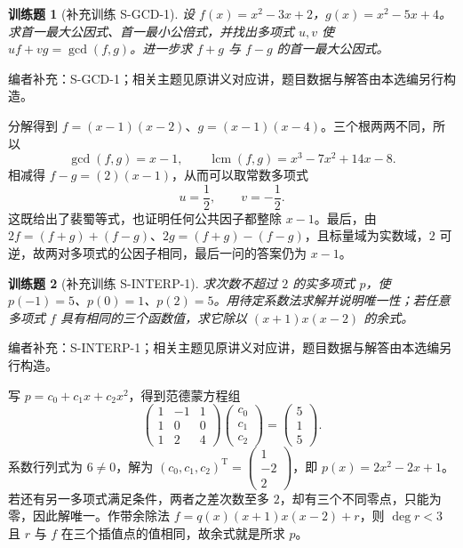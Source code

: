 \documentclass[UTF8,12pt,a4paper,fontset=fandol]{ctexart}
\newtheorem{exercise}{训练题}[section]
\begin{document}
\begin{exercise}[补充训练 S-GCD-1]\label{prob:S-GCD-1}
设 $f(x)=x^{2}-3x+2$，$g(x)=x^{2}-5x+4$。求首一最大公因式、首一最小公倍式，并找出多项式 $u,v$ 使 $uf+vg=\gcd(f,g)$。进一步求 $f+g$ 与 $f-g$ 的首一最大公因式。
\end{exercise}
\noindent 编者补充：S-GCD-1；相关主题见原讲义对应讲，题目数据与解答由本选编另行构造。
\begin{solve}
分解得到 $f=(x-1)(x-2)$、$g=(x-1)(x-4)$。三个根两两不同，所以
\[\gcd(f,g)=x-1,\qquad\operatorname{lcm}(f,g)=x^{3}-7x^{2}+14x-8.\]
相减得 $f-g=(2)(x-1)$，从而可以取常数多项式
\[u=\frac{1}{2},\qquad v=-\frac{1}{2}.\]
这既给出了裴蜀等式，也证明任何公共因子都整除 $x-1$。最后，由 $2f=(f+g)+(f-g)$、$2g=(f+g)-(f-g)$，且标量域为实数域，$2$ 可逆，故两对多项式的公因子相同，最后一问的答案仍为 $x-1$。
\end{solve}

\begin{exercise}[补充训练 S-INTERP-1]\label{prob:S-INTERP-1}
求次数不超过 $2$ 的实多项式 $p$，使 $p(-1)=5$、$p(0)=1$、$p(2)=5$。用待定系数法求解并说明唯一性；若任意多项式 $f$ 具有相同的三个函数值，求它除以 $(x+1)x(x-2)$ 的余式。
\end{exercise}
\noindent 编者补充：S-INTERP-1；相关主题见原讲义对应讲，题目数据与解答由本选编另行构造。
\begin{solve}
写 $p=c_0+c_1x+c_2x^2$，得到范德蒙方程组
\[\begin{pmatrix}1&-1&1\\1&0&0\\1&2&4\end{pmatrix}\begin{pmatrix}c_0\\c_1\\c_2\end{pmatrix}=\begin{pmatrix}5\\1\\5\end{pmatrix}.\]
系数行列式为 $6\ne0$，解为 $(c_0,c_1,c_2)^{\mathrm T}=\begin{pmatrix}1\\-2\\2\end{pmatrix}$，即 $p(x)=2x^{2}-2x+1$。若还有另一多项式满足条件，两者之差次数至多 $2$，却有三个不同零点，只能为零，因此解唯一。作带余除法 $f=q(x)(x+1)x(x-2)+r$，则 $\deg r<3$ 且 $r$ 与 $f$ 在三个插值点的值相同，故余式就是所求 $p$。
\end{solve}
\end{document}
